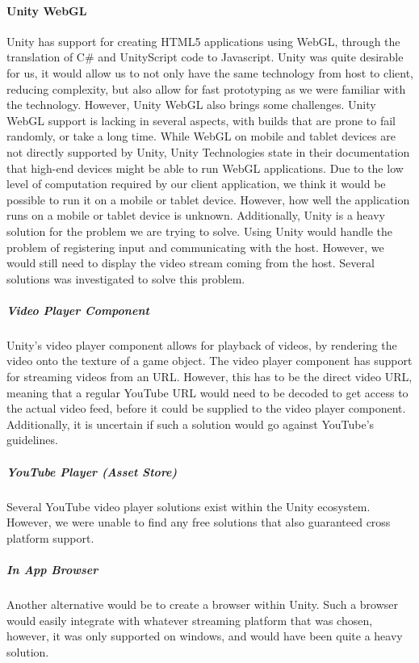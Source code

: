 \paragraph{Unity WebGL}
Unity has support for creating HTML5 applications using WebGL\cite{unity_webgl}, through the translation of C\# and UnityScript code to Javascript. Unity was quite desirable for us, it would allow us to not only have the same technology from host to client, reducing complexity, but also allow for fast prototyping as we were familiar with the technology. 
However, Unity WebGL also brings some challenges. Unity WebGL support is lacking in several aspects, with builds that are prone to fail randomly, or take a long time. While WebGL on mobile and tablet devices are not directly supported by Unity, Unity Technologies state in their documentation that high-end devices might be able to run WebGL applications. Due to the low level of computation required by our client application, we think it would be possible to run it on a mobile or tablet device. However, how well the application runs on a mobile or tablet device is unknown. Additionally, Unity is a heavy solution for the problem we are trying to solve.
Using Unity would handle the problem of registering input and communicating with the host. However, we would still need to display the video stream coming from the host. Several solutions was investigated to solve this problem.

\subparagraph{Video Player Component}
Unity's video player component allows for playback of videos, by rendering the video onto the texture of a game object\cite{unity_video_player}. The video player component has support for streaming videos from an URL. However, this has to be the direct video URL, meaning that a regular YouTube URL would need to be decoded to get access to the actual video feed, before it could be supplied to the video player component. Additionally, it is uncertain if such a solution would go against YouTube's guidelines\cite[5.1 A]{youtube_guidelines}.

\subparagraph{YouTube Player (Asset Store)}
Several YouTube video player solutions exist within the Unity ecosystem. However, we were unable to find any free solutions that also guaranteed cross platform support. 

\subparagraph{In App Browser}
Another alternative would be to create a browser within Unity\cite{unity_simple_browser}. Such a browser would easily integrate with whatever streaming platform that was chosen, however, it was only supported on windows, and would have been quite a heavy solution.

